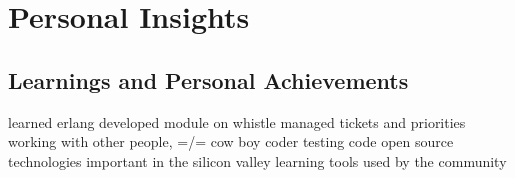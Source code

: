 \chapter{Personal Insights}
\label{ch:insights}

\section{Learnings and Personal Achievements}
learned erlang
developed module on whistle
managed tickets and priorities
working with other people, =/= cow boy coder
testing code
open source technologies important in the silicon valley
learning tools used by the community
